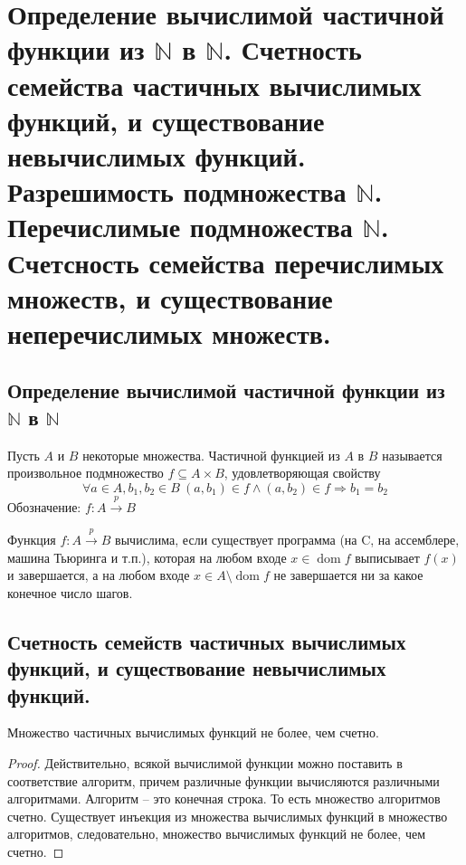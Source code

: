 \section{Определение вычислимой частичной функции из $\mathbb{N}$ в $\mathbb{N}$. Счетность семейства частичных вычислимых функций, и существование невычислимых функций. Разрешимость подмножества $\mathbb{N}$. Перечислимые подмножества $\mathbb{N}$. Счетсность семейства перечислимых множеств, и существование неперечислимых множеств.}



\subsection{Определение вычислимой частичной функции из $\mathbb{N}$ в $\mathbb{N}$}
\begin{definition}
  Пусть $A$ и $B$ некоторые множества. Частичной функцией из $A$ в $B$ называется произвольное подмножество $f \subseteq A \times B$, удовлетворяющая свойству
  \[
    \forall a \in A, b_1,b_2 \in B \> (a,b_1) \in f \wedge (a,b_2) \in f \Rightarrow b_1 = b_2
  \]
  Обозначение: $f:A \overset{p}{\to} B$
\end{definition}

\begin{definition}
  Функция $f: A \overset{p}{\to} B$ вычислима, если существует программа (на C, на ассемблере, машина Тьюринга и т.п.), которая на любом входе $x \in \operatorname{dom} f$ выписывает $f(x)$ и завершается, а на любом входе $x \in A \setminus \operatorname{dom} f$ не завершается ни за какое конечное число шагов.
\end{definition}

\subsection{Счетность семейств частичных вычислимых функций, и существование невычислимых функций.}

\begin{statement}
  Множество частичных вычислимых функций не более, чем счетно.
  \begin{proof}
    Действительно, всякой вычислимой функции можно поставить в соответствие алгоритм, причем различные функции вычисляются различными алгоритмами. Алгоритм -- это конечная строка. То есть множество алгоритмов счетно. Существует инъекция из множества вычислимых функций в множество алгоритмов, следовательно, множество вычислимых функций не более, чем счетно.
  \end{proof}
\end{statement}

